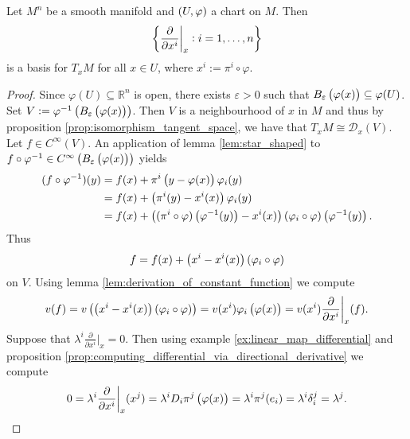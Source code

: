 \begin{proposition}
	\label{prop:basis_tangent_space}
	Let $M^n$ be a smooth manifold and $\del[0]{U,\varphi}$ a chart on $M$. Then 
	\begin{equation*}
		\cbr[3]{\frac{\partial}{\partial x^i}\bigg\vert_x : i = 1,\dots,n}
	\end{equation*}
	\noindent is a basis for $T_xM$ for all $x \in U$, where $x^i := \pi^i \circ \varphi$.
\end{proposition}

\begin{proof}
	Since $\varphi(U) \subseteq \mathbb{R}^n$ is open, there exists $\varepsilon > 0$ such that $B_\varepsilon\del[1]{\varphi(x)} \subseteq \varphi(U)$. Set $V := \varphi^{-1}\del[1]{B_\varepsilon\del[1]{\varphi(x)}}$. Then $V$ is a neighbourhood of $x$ in $M$ and thus by proposition \ref{prop:isomorphism_tangent_space}, we have that $T_xM \cong \mathcal{D}_x(V)$. Let $f \in C^\infty(V)$. An application of lemma \ref{lem:star_shaped} to $f \circ \varphi^{-1} \in C^\infty\del[1]{B_\varepsilon\del[1]{\varphi(x)}}$ yields
	\begin{align*}
		(f \circ \varphi^{-1})(y) &= f(x) + \pi^i\del[1]{y - \varphi(x)}\varphi_i(y)\\
		&= f(x) + \del[1]{\pi^i(y) - x^i(x)}\varphi_i(y)\\
		&= f(x) + \del[1]{(\pi^i \circ \varphi)\del[1]{\varphi^{-1}(y)} - x^i(x)}(\varphi_i \circ \varphi)\del[1]{\varphi^{-1}(y)}.\\
	\end{align*}
	Thus 
	\begin{equation*}
		f = f(x) + \del[1]{x^i - x^i(x)}(\varphi_i \circ \varphi) 
	\end{equation*}
	\noindent on $V$. Using lemma \ref{lem:derivation_of_constant_function} we compute
	\begin{equation}
		\label{eq:derivation_in_coordinates}
		v(f) = v\del[1]{\del[1]{x^i - x^i(x)}(\varphi_i \circ \varphi)} = v(x^i)\varphi_i\del[1]{\varphi(x)} = v(x^i)\frac{\partial}{\partial x^i}\bigg\vert_x(f).
	\end{equation}
	Suppose that $\lambda^i\frac{\partial}{\partial x^i}\big\vert_x = 0$. Then using example \ref{ex:linear_map_differential} and proposition \ref{prop:computing_differential_via_directional_derivative} we compute
	\begin{equation}
		\label{eq:linear_independence_tangent_basis}
		0 = \lambda^i\frac{\partial}{\partial x^i}\bigg\vert_x(x^j) = \lambda^i D_i\pi^j\del[1]{\varphi(x)} = \lambda^i \pi^j(e_i) = \lambda^i \delta^j_i = \lambda^j.
	\end{equation}
\end{proof}

